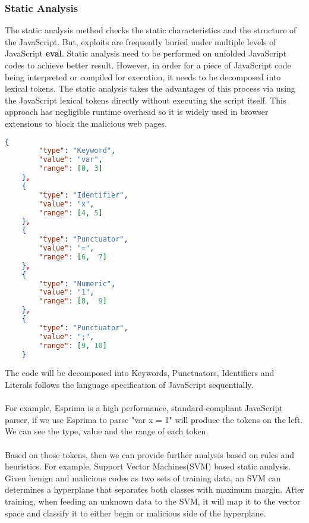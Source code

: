 \documentclass[11pt]{article}
\begin{document}
\subsubsection{Static Analysis}
The static analysis method checks the static characteristics and the structure of the JavaScript. But, exploits are frequently buried under multiple levels of JavaScript \textbf{eval}. Static analysis need to be performed on unfolded JavaScript codes to achieve better result. However, in order for a piece of JavaScript code being interpreted or compiled for execution, it needs to be decomposed into lexical tokens. The static analysis takes the advantages of this process via using the JavaScript lexical tokens directly without executing the script itself. This approach has negligible runtime overhead so it is widely used in browser extensions to block the malicious web pages.
\begin{multicols}{2}
\begin{lstlisting}[language=json,title=(tokens from Esprima)]
    {
        "type": "Keyword",
        "value": "var",
        "range": [0, 3]
    },
    {
        "type": "Identifier",
        "value": "x",
        "range": [4, 5]
    },
    {
        "type": "Punctuator",
        "value": "=",
        "range": [6,  7]
    },
    {
        "type": "Numeric",
        "value": "1",
        "range": [8,  9]
    },
    {
        "type": "Punctuator",
        "value": ";",
        "range": [9, 10]
    }
	\end{lstlisting} 
The code will be decomposed into Keywords, Punctuators, Identifiers and Literals follows the language specification of JavaScript \cite{JavaScript} sequentially.  \\ \\
For example, Esprima\cite{Esprima} is a high performance, standard-compliant JavaScript parser, if we use Esprima to parse "var x = 1" will produce the tokens on the left. We can see the type, value and the range of each token.  \\ \\
Based on those tokens, then we can provide further analysis based on rules and heuristics. For example, Support Vector Machines(SVM) based static analysis. Given benign and malicious codes as two sets of training data, an SVM can determines a hyperplane that separates both classes with maximum margin. After training, when feeding an unknown data to the SVM, it will map it to the vector space and classify it to either begin or malicious side of the hyperplane.
\end{multicols} 
\end{document}
